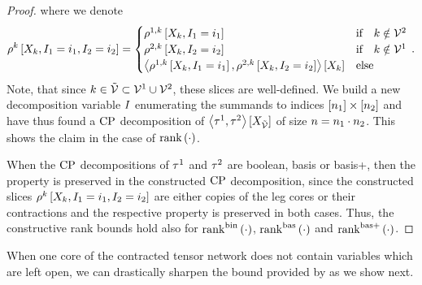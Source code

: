 \begin{proof}
    where we denote
    \begin{align*}
        \rho^{k}\left[X_{k},I_{1}=i_{1},I_{2}=i_{2}\right]
        = \begin{cases}
              \rho^{1,k}\left[X_{k},I_{1}=i_{1}\right]  & \text{if}\quad k \notin \mathcal{V}^{2} \\
              \rho^{2,k}\left[X_{k},I_{2}=i_{2}\right]  & \text{if}\quad k \notin \mathcal{V}^{1} \\
              \left\langle \rho^{1,k}\left[X_{k},I_{1}=i_{1}\right], \rho^{2,k}\left[X_{k},I_{2}=i_{2}\right]\right\rangle \left[ X_{k} \right]  & \text{else}
        \end{cases} \, .
    \end{align*}
    Note, that since $k\in\tilde{\mathcal{V}}\subset\mathcal{V}^{1}\cup\mathcal{V}^{2}$, these slices are well-defined.
    We build a new decomposition variable $I$ enumerating the summands to indices $[n_{1}]\times[n_{2}]$ and have thus found a $\mathrm{CP}$ decomposition of $\left\langle \tau^{1},\tau^{2}\right\rangle \left[ X_{\tilde{\mathcal{V}}} \right]$ of size $n=n_{1}\cdot n_{2}$.
    This shows the claim in the case of $\mathrm{rank}\left(\cdot\right)$.

    When the $\mathrm{CP}$ decompositions of $\tau^{1}$ and $\tau^{2}$ are boolean, basis or basis+, then the property is preserved in the constructed $\mathrm{CP}$ decomposition, since the constructed slices $\rho^{k}\left[X_{k},I_{1}=i_{1},I_{2}=i_{2}\right]$ are either copies of the leg cores or their contractions and the respective property is preserved in both cases.
    Thus, the constructive rank bounds hold also for $\mathrm{rank}^{\mathrm{bin}}\left(\cdot\right)$, $\mathrm{rank}^{\mathrm{bas}}\left(\cdot\right)$ and $\mathrm{rank}^{\mathrm{bas+}}\left(\cdot\right)$.
\end{proof}

When one core of the contracted tensor network does not contain variables which are left open, we can drastically sharpen the bound provided by  as we show next.

